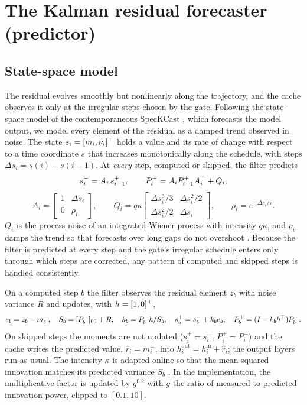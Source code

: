 \section{The Kalman residual forecaster (predictor)}\label{sec:kalsea-predictor}

\subsection{State-space model}
The residual evolves smoothly but nonlinearly along the trajectory, and the cache observes it only at the irregular steps chosen by the gate. Following the state-space model of the contemporaneous SpecKCast \citep{rajabi2026speckcast}, which forecasts the model output, we model every element of the residual as a damped trend observed in noise. The state $s_i=[m_i,\nu_i]^{\top}$ holds a value and its rate of change with respect to a time coordinate $s$ that increases monotonically along the schedule, with steps $\Delta s_i = s(i)-s(i-1)$. At \emph{every} step, computed or skipped, the filter predicts
\begin{equation}\label{eq:kalsea-predict}
  s^-_i = A_i\, s^+_{i-1}, \qquad P^-_i = A_i P^+_{i-1}A_i^{\top} + Q_i,
\end{equation}
\begin{equation}\label{eq:kalsea-AQ}
  A_i = \begin{bmatrix} 1 & \Delta s_i \\ 0 & \rho_i\end{bmatrix}, \qquad
  Q_i = q\kappa\begin{bmatrix} \Delta s_i^3/3 & \Delta s_i^2/2 \\ \Delta s_i^2/2 & \Delta s_i\end{bmatrix}, \qquad \rho_i = e^{-\Delta s_i/\tau}.
\end{equation}
$Q_i$ is the process noise of an integrated Wiener process \citep{barshalom2001estimation} with intensity $q\kappa$, and $\rho_i$ damps the trend so that forecasts over long gaps do not overshoot \citep{gardner1985damped}. Because the filter is predicted at every step and the gate's irregular schedule enters only through which steps are corrected, any pattern of computed and skipped steps is handled consistently.

On a computed step $b$ the filter observes the residual element $z_b$ with noise variance $R$ and updates, with $h=[1,0]^{\top}$,
\begin{equation}\label{eq:kalsea-update}
  e_b = z_b - m^-_b,\quad S_b = [P^-_b]_{00}+R,\quad k_b = P^-_b h/S_b,\quad s^+_b = s^-_b + k_b e_b,\quad P^+_b = (I-k_bh^{\top})P^-_b .
\end{equation}
On skipped steps the moments are not updated ($s^+_i=s^-_i$, $P^+_i=P^-_i$) and the cache writes the predicted value, $\hat r_i = m^-_i$, into $h^{\mathrm{out}}_i = h^{\mathrm{in}}_i + \hat r_i$; the output layers run as usual. The intensity $\kappa$ is adapted online so that the mean squared innovation matches its predicted variance $S_b$ \citep{mehra1972adaptive}. In the implementation, the multiplicative factor is updated by $g^{0.2}$ with $g$ the ratio of measured to predicted innovation power, clipped to $[0.1,10]$.


